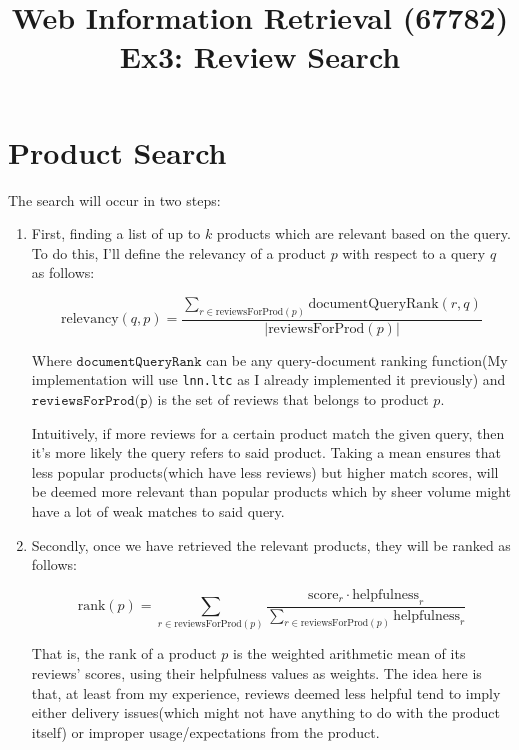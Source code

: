 \documentclass[11pt]{article}
\begin{document}
\title{Web Information Retrieval (67782)\\ Ex3: Review Search}
\date{}

\maketitle
{}

\section{Product Search}

The search will occur in two steps:

\begin{enumerate}
	\item First, finding a list of up to $k$ products which are relevant based on the query. To do this, I'll define the relevancy of a product $p$ with respect
	to a query $q$ as follows:
	
	\[
	\text{relevancy}(q,p)=\frac{\sum_{r\in\text{reviewsForProd}(p)}\text{documentQueryRank}(r,q)}{\left|\text{reviewsForProd}(p)\right|}
	\]
	
	
	Where $\texttt{documentQueryRank}$ can be any query-document ranking function(My implementation will use \texttt{lnn.ltc} as I already implemented it previously)
	and $\texttt{reviewsForProd(p)}$ is the set of reviews that belongs to product $p$.
	
	
	Intuitively, if more reviews for a certain product match the given query, then it's more likely the query refers to said product. Taking a mean ensures that less popular products(which have less reviews) but higher match scores, will be deemed more relevant than popular products which by sheer volume might have a lot of weak matches to said query.
	
	\item Secondly, once we have retrieved the relevant products, they will be ranked as follows:
	
	\[ 
	\text{rank}(p) = 
	\sum_{r \in \text{reviewsForProd}(p)}^{}
	\frac{\text{score}_r \cdot \text{helpfulness}_r}
	{\sum_{r \in \text{reviewsForProd}(p)}^{} \text{helpfulness}_r}
	 \]
	
	 
	That is, the rank of a product $p$ is the weighted arithmetic mean of its reviews' scores,
	using their helpfulness values as weights. The idea here is that, at least from my experience, reviews deemed less helpful tend to imply either delivery issues(which might not have anything to do with the product itself) or improper usage/expectations from the product. 
	
	 
	
\end{enumerate}
\end{document}
